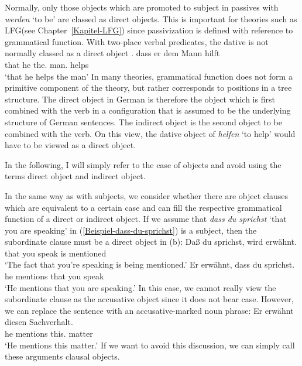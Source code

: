 {Normally, only those objects which are promoted to subject in passives with \emph{werden} `to be' are classed as
direct objects. This is important for theories such as LFG\indexlfg (see Chapter~\ref{Kapitel-LFG}) since
passivization is defined with reference to grammatical function. With two-place verbal predicates, the dative 
is not normally classed as a direct object \citep{Cook2006a-u}. 
\ea
\gll dass er dem Mann hilft\\
     that he the.\dat{} man.\dat{} helps\\
\glt `that he helps the man'
\z
In many theories, grammatical function does not form a primitive component of the theory, but rather corresponds to positions
in a tree structure. The direct object in German is therefore the object which is first combined
with the verb in a configuration that is assumed to be the underlying structure of German sentences. The
indirect object is the second object to be combined with the verb. On this view, the dative object of \emph{helfen} `to help'
would have to be viewed as a direct object.

In the following, I will simply refer to the case of objects and avoid using the terms direct object and indirect object.

In the same way as with subjects, we consider whether there are object clauses which are
equivalent to a certain case and can fill the respective grammatical function of a direct or indirect object. If we assume that 
\emph{dass du sprichst} `that you are speaking' in (\ref{Beispiel-dass-du-sprichst}) is a subject,
then the subordinate clause must be a direct object in (b):
\eal
\ex\label{Beispiel-dass-du-sprichst} 
\gll Daß du sprichst, wird erwähnt.\\
     that you speak is mentioned\\
\glt `The fact that you're speaking is being mentioned.'
\ex
\gll Er erwähnt, dass du sprichst.\\
	 he mentions that you speak\\
\glt `He mentions that you are speaking.'
\zl
In this case, we cannot really view the subordinate clause as the accusative object since it does not bear case. However, we can replace the sentence with an accusative-marked
noun phrase:
\ea
\gll Er erwähnt diesen Sachverhalt.\\
	 he mentions this.\acc{} matter\\
\glt `He mentions this matter.'
\z
If we want to avoid this discussion, we can simply call these arguments clausal objects.


}
